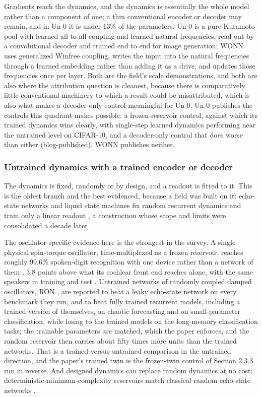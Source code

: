 \documentclass[a4paper,fleqn]{cas-sc}
\begin{document}
Gradients reach the dynamics, and the dynamics is essentially the whole
model rather than a component of one; a thin conventional encoder or
decoder may remain, and in Un-0 it is under 13\% of the parameters. Un-0
\citep{un-0} is a pure Kuramoto pool with learned all-to-all coupling
and learned natural frequencies, read out by a convolutional decoder and
trained end to end for image generation; WONN \citep{wonn} uses
generalized Winfree coupling, writes the input into the natural
frequencies through a learned embedding rather than adding it as a
drive, and updates those frequencies once per layer. Both are the
field's scale demonstrations, and both are also where the attribution
question is cleanest, because there is comparatively little conventional
machinery to which a result could be misattributed, which is also what
makes a decoder-only control meaningful for Un-0. Un-0 publishes the
controls this quadrant makes possible: a frozen-reservoir control,
against which its trained dynamics wins clearly, with single-step
learned dynamics performing near the untrained level on CIFAR-10, and a
decoder-only control that does worse than either (blog-published). WONN
publishes neither.

\subsubsection{Untrained dynamics with a trained encoder or
decoder}\label{sec-2-2-4}

The dynamics is fixed, randomly or by design, and a readout is fitted to
it. This is the oldest branch and the best evidenced, because a field
was built on it: echo-state networks and liquid state machines fix
random recurrent dynamics and train only a linear readout
\citep{jaeger2001, maass2002}, a construction whose scope and limits
were consolidated a decade later \citep{lukosevicius2009}.

The oscillator-specific evidence here is the strongest in the survey. A
single physical spin-torque oscillator, time-multiplexed as a frozen
reservoir, reaches roughly 99.6\% spoken-digit recognition with one
device rather than a network of them \citep{torrejon2017}, 3.8 points
above what its cochlear front end reaches alone, with the same speakers
in training and test \citep{abreu-araujo2020}. Untrained networks of
randomly coupled damped oscillators, RON \citep{ceni2024}, are reported
to beat a leaky echo-state network on every benchmark they run, and to
beat fully trained recurrent models, including a trained version of
themselves, on chaotic forecasting and on small-parameter
classification, while losing to the trained models on the long-memory
classification tasks; the trainable parameters are matched, which the
paper enforces, and the random reservoir then carries about fifty times
more units than the trained networks. That is a trained-versus-untrained
comparison in the untrained direction, and the paper's trained twin is
the frozen-twin control of \hyperref[sec-2-3-3]{Section 2.3.3} run in
reverse. And designed dynamics can replace random dynamics at no cost:
deterministic minimum-complexity reservoirs match classical random
echo-state networks \citep{rodan2011}.
\end{document}
